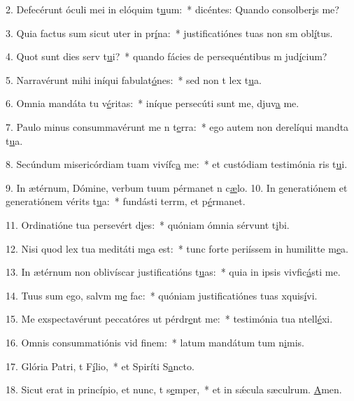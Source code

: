 2. Defecérunt óculi mei in elóquim t\uline{u}um:~* dicéntes: Quando consolber\uline{i}s me?\par 
3. Quia factus sum sicut uter in pr\uline{í}na:~* justificatiónes tuas non sm obl\uline{í}tus.\par 
4. Quot sunt dies serv t\uline{u}i?~* quando fácies de persequéntibus m jud\uline{í}cium?\par 
5. Narravérunt mihi iníqui fabulat\uline{ó}nes:~* sed non t lex t\uline{u}a.\par 
6. Omnia mandáta tu v\uline{é}ritas:~* iníque persecúti sunt me, djuv\uline{a} me.\par 
7. Paulo minus consummavérunt me n t\uline{e}rra:~* ego autem non derelíqui mandta t\uline{u}a.\par 
8. Secúndum misericórdiam tuam vivífc\uline{a} me:~* et custódiam testimónia ris t\uline{u}i.\par 
9. In ætérnum, Dómine, verbum tuum pérmanet n c\uline{æ}lo.
10. In generatiónem et generatiónem vérits t\uline{u}a:~* fundásti terrm, et p\uline{é}rmanet.\par 
11. Ordinatióne tua persevért d\uline{i}es:~* quóniam ómnia sérvunt t\uline{i}bi.\par 
12. Nisi quod lex tua meditáti m\uline{e}a est:~* tunc forte periíssem in humilitte m\uline{e}a.\par 
13. In ætérnum non oblivíscar justificatións t\uline{u}as:~* quia in ipsis vivfic\uline{á}sti me.\par 
14. Tuus sum ego, salvm m\uline{e} fac:~* quóniam justificatiónes tuas xquis\uline{í}vi.\par 
15. Me exspectavérunt peccatóres ut pérdr\uline{e}nt me:~* testimónia tua ntell\uline{é}xi.\par 
16. Omnis consummatiónis vid f\uline{i}nem:~* latum mandátum tum n\uline{i}mis.\par 
17. Glória Patri, t F\uline{í}lio,~* et Spiríti S\uline{a}ncto.\par 
18. Sicut erat in princípio, et nunc, t s\uline{e}mper,~* et in sǽcula sæculrum. \uline{A}men.\par 
